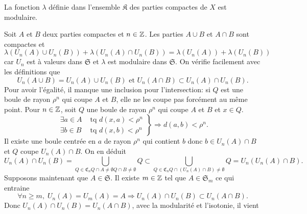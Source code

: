 \begin{propn}\label{Prop:PromModul}
 La fonction $\lambda$ définie dans l'ensemble $\mathfrak{K}$ des parties compactes de $X$ est modulaire.
\end{propn}
\begin{demo}
Soit $A$ et $B$ deux parties compactes et $n\in \mathbb{Z}$. Les parties $A \cup B$ et $A \cap B$ sont compactes et
\begin{displaymath}
 \lambda(U_n(A)\cup U_n(B)) + \lambda(U_n(A) \cap U_n(B)) = \lambda(U_n(A)) + \lambda(U_n(B))
\end{displaymath}
car $U_n$ est à valeurs dans $\mathfrak{S}$ et $\lambda$ est modulaire dans $\mathfrak{S}$.\newline
On vérifie facilement avec les définitions que
\begin{displaymath}
 U_n(A \cup B) = U_n(A)\cup U_n(B) \text{ et } U_n(A \cap B) \subset U_n(A)\cap U_n(B).
\end{displaymath}
Pour avoir l'égalité, il manque une inclusion pour l'intersection: si $Q$ est une boule de rayon $\rho^n$ qui coupe $A$ et $B$, elle ne les coupe pas forcément au même point.\newline
Pour $n\in \mathbb{Z}$, soit $Q$ une boule de rayon $\rho^n$ qui coupe $A$ et $B$ et $x\in Q$.
\begin{displaymath}
 \left.
   \begin{aligned}
     \exists a \in A &\text{ tq } d(x,a) < \rho^n \\
     \exists b \in B &\text{ tq } d(x,b) < \rho^n
   \end{aligned}
  \right\rbrace
  \Rightarrow d(a,b) < \rho ^n.
\end{displaymath}
Il existe une boule centrée en $a$ de rayon $\rho^n$ qui contient $b$ donc $b \in U_n(A) \cap B$ et $Q$ coupe $U_n(A) \cap B$. On en déduit
\begin{displaymath}
 U_n(A) \cap U_n(B) = \bigcup_{Q \in \mathfrak{C}_n Q\cap A \neq \emptyset Q\cap B \neq \emptyset} Q
 \subset \bigcup_{Q \in \mathfrak{C}_n Q\cap \left(U_n(A)\cap B\right) \neq \emptyset} Q
 = U_n(U_n(A) \cap B).
\end{displaymath}
Supposons maintenant que $A \in \mathfrak{S}$. Il existe $m \in \mathbb{Z}$ tel que $A \in \mathfrak{S}_m$ ce qui entraine
\begin{displaymath}
 \forall n \geq m,\; U_n(A) = U_m(A) = A \Rightarrow U_n(A)\cap U_n(B) \subset U_n(A \cap B).
\end{displaymath}
Donc $U_n(A)\cap U_n(B) = U_n(A \cap B)$, avec la modularité et l'isotonie, il vient

\end{demo}

